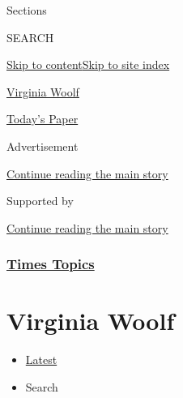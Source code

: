 Sections

SEARCH

\protect\hyperlink{site-content}{Skip to
content}\protect\hyperlink{site-index}{Skip to site index}

\href{https://www.nytimes3xbfgragh.onion/topic/person/virginia-woolf}{Virginia
Woolf}

\href{https://myaccount.nytimes3xbfgragh.onion/auth/login?response_type=cookie\&client_id=vi}{}

\href{https://www.nytimes3xbfgragh.onion/section/todayspaper}{Today's
Paper}

Advertisement

\protect\hyperlink{after-top}{Continue reading the main story}

Supported by

\protect\hyperlink{after-sponsor}{Continue reading the main story}

\hypertarget{times-topics}{%
\subsubsection{\texorpdfstring{\href{/index.html}{Times
Topics}}{Times Topics}}\label{times-topics}}

\hypertarget{virginia-woolf}{%
\section{Virginia Woolf}\label{virginia-woolf}}

\begin{itemize}
\tightlist
\item
  \protect\hyperlink{stream-panel}{Latest}
\item
  Search
\end{itemize}

